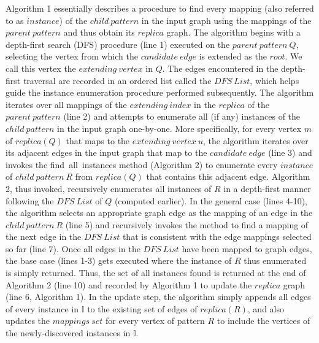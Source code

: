 Algorithm 1 essentially describes a procedure to find every mapping (also referred to as $instance$) of the $child\ pattern$ in the input graph using the mappings of the $parent\ pattern$ and thus obtain its $replica$ graph. The algorithm begins with a depth-first search ({\sf DFS}) procedure (line 1) executed on the $parent\ pattern\ Q$, selecting the vertex from which the $candidate\ edge$ is extended as the $root$. We call this vertex the $extending\ vertex$ in $Q$. The edges encountered in the depth-first traversal are recorded in an ordered list called the $DFS\ List$, which helps guide the instance enumeration procedure performed subsequently. The algorithm iterates over all mappings of the $extending\ index$ in the $replica$ of the $parent\ pattern$ (line 2) and attempts to enumerate all (if any) instances of the $child\ pattern$ in the input graph one-by-one. More specifically, for every vertex $m$ of $replica(Q)$ that maps to the $extending\ vertex\ u$, the algorithm iterates over its adjacent edges in the input graph that map to the $candidate\ edge$ (line 3) and invokes the {\sf find\ all\ instances} method (Algorithm 2) to enumerate every $instance$ of $child\ pattern\ R$ from $replica(Q)$ that contains this adjacent edge. Algorithm 2, thus invoked, recursively enumerates all instances of $R$ in a depth-first manner following the $DFS\ List$ of $Q$ (computed earlier). In the general case (lines 4-10), the algorithm selects an appropriate graph edge as the mapping of an edge in the $child\ pattern\ R$ (line 5) and recursively invokes the method to find a mapping of the next edge in the $DFS\ List$ that is consistent with the edge mappings selected so far (line 7). Once all edges in the $DFS\ List$ have been mapped to graph edges, the base case (lines 1-3) gets executed where the instance of $R$ thus enumerated is simply returned. Thus, the set of all instances found is returned at the end of Algorithm 2 (line 10) and recorded by Algorithm 1 to update the $replica$ graph (line 6, Algorithm 1). In the update step, the algorithm simply appends all edges of every instance in $\mathbb{I}$ to the existing set of edges of $replica(R)$, and also updates the $mappings\ set$ for every vertex of pattern $R$ to include the vertices of the newly-discovered instances in $\mathbb{I}$. 
